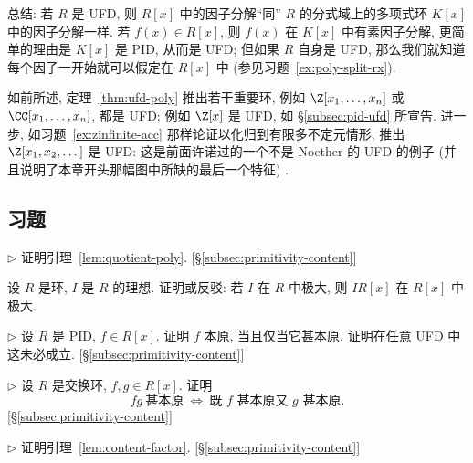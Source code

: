 \noindent 总结: 若 $R$ 是 UFD, 则 $R[x]$ 中的因子分解``同'' $R$ 的分式域上的多项式环 $K[x]$ 中的因子分解一样. 若 $f(x)\in R[x]$, 则 $f(x)$ 在 $K[x]$ 中有素因子分解, 更简单的理由是 $K[x]$ 是 PID, 从而是 UFD; 但如果 $R$ 自身是 UFD, 那么我们就知道每个因子一开始就可以假定在 $R[x]$ 中 (参见习题~\ref{ex:poly-split-rx}).

\begin{example}\label{ex:nonnoeth-ufd}
如前所述, 定理~\ref{thm:ufd-poly} 推出若干重要环, 例如 $\Z[x_1,\dots,x_n]$ 或 $\CC[x_1,\dots,x_n]$, 都是 UFD; 例如 $\Z[x]$ 是 UFD, 如 §\ref{subsec:pid-ufd} 所宣告. 进一步, 如习题~\ref{ex:zinfinite-acc} 那样论证以化归到有限多不定元情形, 推出 $\Z[x_1,x_2,\dots]$ 是 UFD: 这是前面许诺过的一个不是 Noether 的 UFD 的例子 (并且说明了本章开头那幅图中所缺的最后一个特征)%
.
\end{example}

\subsection*{习题}
{}

\begin{prob}
\label{ex:quotient-poly}
$\triangleright$ 证明引理~\ref{lem:quotient-poly}. [§\ref{subsec:primitivity-content}]
\end{prob}

\begin{prob}
\label{ex:maximal-poly}
设 $R$ 是环, $I$ 是 $R$ 的理想. 证明或反驳: 若 $I$ 在 $R$ 中极大, 则 $IR[x]$ 在 $R[x]$ 中极大.
\end{prob}

\begin{prob}
\label{ex:pid-primitive-very}
$\triangleright$ 设 $R$ 是 PID, $f\in R[x]$. 证明 $f$ 本原, 当且仅当它甚本原. 证明在任意 UFD 中这未必成立. [§\ref{subsec:primitivity-content}]
\end{prob}

\begin{prob}
\label{ex:very-primitive-product}
$\triangleright$ 设 $R$ 是交换环, $f,g\in R[x]$. 证明
\[
fg\ \text{甚本原}\ \Longleftrightarrow\ \text{既 } f \text{ 甚本原又 } g \text{ 甚本原}.
\]
[§\ref{subsec:primitivity-content}]
\end{prob}

\begin{prob}
\label{ex:lemma4-7}
$\triangleright$ 证明引理~\ref{lem:content-factor}. [§\ref{subsec:primitivity-content}]
\end{prob}


